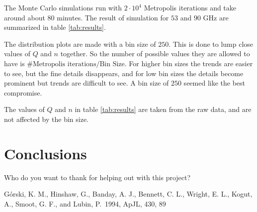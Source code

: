 \documentclass{emulateapj}
\begin{document}
The Monte Carlo simulations run with $2\cdot 10^4$ Metropolis iterations and take around about $80$ minutes. The result of simulation for $53$ and $90$ GHz are summarized in table \ref{tab:results}.\

The distribution plots are made with a bin size of $250$. This is done to lump close values of $Q$ and $n$ together. So the number of possible values they are allowed to have is $\#\text{Metropolis iterations}/\text{Bin Size}$. For higher bin sizes the trends are easier to see, but the fine details disappears, and for low bin sizes the details become prominent but trends are difficult to see. A bin size of $250$ seemed like the best compromise. 

The values of $Q$ and $n$ in table \ref{tab:results} are taken from the raw data, and are not affected by the bin size.











\section{Conclusions}
\label{sec:conclusions}












\begin{acknowledgements}
  Who do you want to thank for helping out with this project?
\end{acknowledgements}

\begin{thebibliography}{}

 G{\'o}rski, K. M.,
  Hinshaw, G., Banday, A. J., Bennett, C. L., Wright, E. L., Kogut,
  A., Smoot, G. F., and Lubin, P.\ 1994, ApJL, 430, 89

\end{thebibliography}
\end{document}
